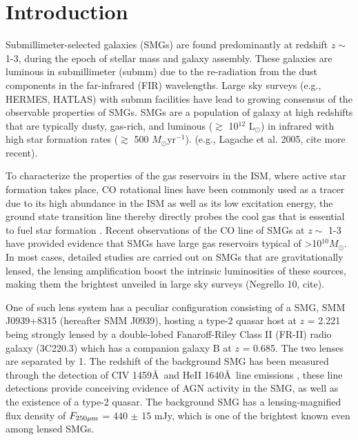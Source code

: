 \documentclass{emulateapj}
\newcommand{\Msun}{\mbox{$M_{\odot}$}}
\newcommand{\Lsun}{\mbox{L$_{\odot}$}}
\newcommand{\pmOne}{$^{-1}$}
\begin{document}
\section{Introduction}\label{sec:intro}
Submillimeter-selected galaxies (SMGs) are found predominantly at redshift $z \sim$ 1-3, during the epoch of stellar mass and 
galaxy assembly. These galaxies are luminous in submillimeter (submm) due to the re-radiation from the dust components in the
 far-infrared (FIR) wavelengths. Large sky surveys (e.g., HERMES, HATLAS) with submm facilities have lead to growing consensus
  of the observable properties of SMGs. SMGs are a population of galaxy at high redshifts that are typically dusty, gas-rich, 
  and luminous ($\gtrsim$ 10$^{12}$ \Lsun) in infrared with high star formation rates ($\gtrsim $ 500 \Msun yr\pmOne). (e.g., Lagache et al. 2005, cite more recent). \par
  To characterize the properties of the gas reservoirs in the ISM, where active star formation takes place, CO rotational lines have been commonly used as a tracer due to its high abundance in the ISM as well as its low excitation energy, the ground state transition line thereby directly probes the cool gas that is essential to fuel star formation \citep{Carilli13a}. Recent observations of the CO line of SMGs at $z \sim$ 1-3 have  
provided evidence that SMGs have large gas reservoirs typical of \textgreater 10$^{10}$\Msun. In most cases, detailed studies are carried out on SMGs that are gravitationally lensed, the lensing amplification boost the intrinsic luminosities of these sources, making them the brightest unveiled in large sky surveys (Negrello 10, cite). \par
One of such lens system has a peculiar configuration consisting of a SMG, SMM J0939+8315 (hereafter SMM J0939), hosting a 
type-2 quasar host at $z$ = 2.221 being strongly lensed by a double-lobed Fanaroff-Riley Class II (FR-II) \citep*{Fanaroff74} radio galaxy (3C220.3) which has a 
companion galaxy B at $z$ = 0.685. The two lenses are separated by 1. The redshift of the background SMG has 
been measured through the detection of CIV 1459\AA\
 and HeII 1640\AA\
line emissions \citep[hereafter H14]{Haas14}, these line detections provide conceiving evidence of AGN activity in the SMG, as well as the 
existence of a type-2 quasar.
The background SMG has a lensing-magnified flux density of $F_{\rm 250\mu m}$ = 440 $\pm$ 15 mJy, which is one of 
the
brightest known even among lensed
SMGs.
\end{document}
